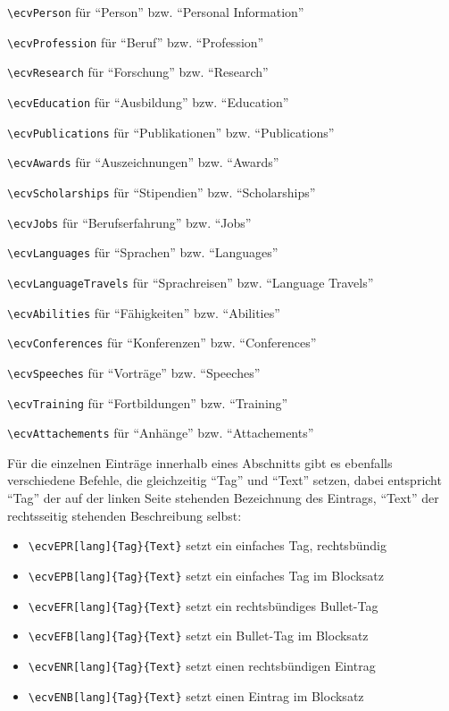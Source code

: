 \documentclass[ngerman]{dtk}
\begin{document}
\begin{compactitem}
\item \verb|\ecvPerson| für \enquote{Person} bzw.  \enquote{Personal Information}
\item \verb|\ecvProfession| für \enquote{Beruf} bzw.    \enquote{Profession}
\item \verb|\ecvResearch| für \enquote{Forschung} bzw.   \enquote{Research}
\item \verb|\ecvEducation| für \enquote{Ausbildung} bzw.    \enquote{Education}
\item \verb|\ecvPublications| für \enquote{Publikationen} bzw.   \enquote{Publications}
\item \verb|\ecvAwards| für \enquote{Auszeichnungen} bzw.   \enquote{Awards}
\item \verb|\ecvScholarships| für \enquote{Stipendien} bzw.    \enquote{Scholarships}
\item \verb|\ecvJobs| für \enquote{Berufserfahrung} bzw.   \enquote{Jobs}
\item \verb|\ecvLanguages| für \enquote{Sprachen} bzw.   \enquote{Languages}
\item \verb|\ecvLanguageTravels| für \enquote{Sprachreisen} bzw.   \enquote{Language Travels}
\item \verb|\ecvAbilities| für \enquote{Fähigkeiten} bzw.   \enquote{Abilities}
\item \verb|\ecvConferences| für \enquote{Konferenzen} bzw.   \enquote{Conferences}
\item \verb|\ecvSpeeches| für \enquote{Vorträge} bzw.   \enquote{Speeches}
\item \verb|\ecvTraining| für \enquote{Fortbildungen} bzw.    \enquote{Training}
\item \verb|\ecvAttachements| für \enquote{Anhänge} bzw.    \enquote{Attachements}
\end{compactitem}

Für die einzelnen Einträge innerhalb eines Abschnitts gibt es ebenfalls verschiedene Befehle, die gleichzeitig \enquote{Tag} und \enquote{Text} setzen, dabei entspricht \enquote{Tag} der auf der linken Seite stehenden Bezeichnung des Eintrags, \enquote{Text} der rechtsseitig stehenden Beschreibung selbst: 

\begin{itemize}
\item \verb|\ecvEPR[lang]{Tag}{Text}| setzt ein einfaches Tag, rechtsbündig
\item \verb|\ecvEPB[lang]{Tag}{Text}| setzt ein einfaches Tag im Blocksatz
\item \verb|\ecvEFR[lang]{Tag}{Text}| setzt ein  rechtsbündiges Bullet-Tag
\item \verb|\ecvEFB[lang]{Tag}{Text}| setzt ein Bullet-Tag im Blocksatz
\item \verb|\ecvENR[lang]{Tag}{Text}| setzt einen rechtsbündigen Eintrag 
\item \verb|\ecvENB[lang]{Tag}{Text}| setzt einen Eintrag im Blocksatz
\end{itemize}
\end{document}
